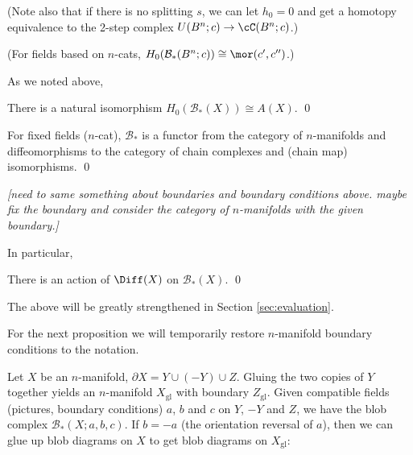 \documentclass[11pt,leqno]{amsart}
\def\bc{{\mathcal B}}
\def\bd{\partial}
\def\sgl{_\mathrm{gl}}
\def\nn#1{{{\it \small [#1]}}}
\begin{document}
(Note also that if there is no splitting $s$, we can let $h_0 = 0$ and get a homotopy
equivalence to the 2-step complex $U(B^n; c) \to \cC(B^n; c)$.)

(For fields based on $n$-cats, $H_0(\bc_*(B^n; c)) \cong \mor(c', c'')$.)

\medskip

As we noted above,
\begin{prop}
There is a natural isomorphism $H_0(\bc_*(X)) \cong A(X)$.
\qed
\end{prop}







\begin{prop}
For fixed fields ($n$-cat), $\bc_*$ is a functor from the category
of $n$-manifolds and diffeomorphisms to the category of chain complexes and
(chain map) isomorphisms.
\qed
\end{prop}

\nn{need to same something about boundaries and boundary conditions above.
maybe fix the boundary and consider the category of $n$-manifolds with the given boundary.}


In particular,
\begin{prop}  \label{diff0prop}
There is an action of $\Diff(X)$ on $\bc_*(X)$.
\qed
\end{prop}

The above will be greatly strengthened in Section \ref{sec:evaluation}.

\medskip

For the next proposition we will temporarily restore $n$-manifold boundary
conditions to the notation.

Let $X$ be an $n$-manifold, $\bd X = Y \cup (-Y) \cup Z$.
Gluing the two copies of $Y$ together yields an $n$-manifold $X\sgl$
with boundary $Z\sgl$.
Given compatible fields (pictures, boundary conditions) $a$, $b$ and $c$ on $Y$, $-Y$ and $Z$,
we have the blob complex $\bc_*(X; a, b, c)$.
If $b = -a$ (the orientation reversal of $a$), then we can glue up blob diagrams on
$X$ to get blob diagrams on $X\sgl$:
\end{document}
